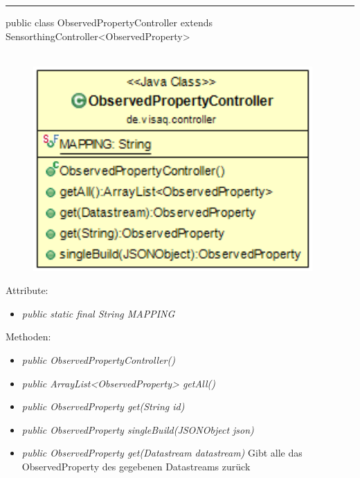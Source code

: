 \rule{\textwidth}{0.4pt}
public class ObservedPropertyController extends SensorthingController<ObservedProperty>
\\\\
\begin{minipage}{0.35\textwidth}
    \begin{figure}[H]
        {\centering\includegraphics[width=0.95\textwidth]{media/backend/controller/classes/ObservedPropertyController.png}}
    \end{figure}
    \end{minipage} \hfill
\begin{minipage}{0.65\textwidth}
\end{minipage}

Attribute:
\begin{itemize}
    \item \emph{public static final String MAPPING} \mappingDescription
\end{itemize}
Methoden:
\begin{itemize}
    \item \emph{public ObservedPropertyController()}
    \item \emph{public ArrayList<ObservedProperty> getAll()}
    \extendsSensorthingController
    \item \emph{public ObservedProperty get(String id)}
    \extendsSensorthingController
    \item \emph{public ObservedProperty singleBuild(JSONObject json)}
    \extendsSensorthingController
    \item \emph{public ObservedProperty get(Datastream datastream)}
    Gibt alle das ObservedProperty des gegebenen Datastreams zurück
\end{itemize}

